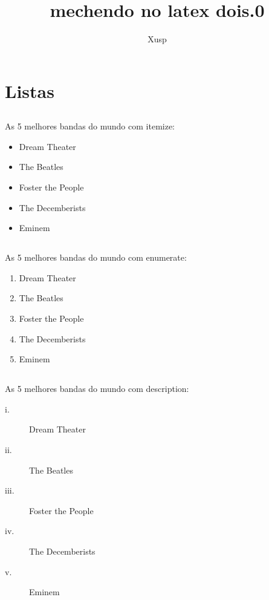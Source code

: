 \documentclass[a4paper,11pt]{report}
\title{mechendo no latex dois.0}
\author{Xusp}
\begin{document}
\maketitle
\tableofcontents
\chapter{Listas}
\section{}
\begin{samepage} %
As 5 melhores bandas do mundo com itemize:
\begin{itemize}
\item Dream Theater
\item The Beatles
\item Foster the People
\item The Decemberists
\item Eminem
\end{itemize}
\end{samepage}
\section{}
\begin{samepage}
As 5 melhores bandas do mundo com enumerate:
\begin{enumerate}
\item Dream Theater
\item The Beatles
\item Foster the People
\item The Decemberists
\item Eminem
\end{enumerate}
\end{samepage}
\section{}
\begin{samepage}
As 5 melhores bandas do mundo com description:
\begin{description}
\item[i.] Dream Theater
\item[ii.] The Beatles
\item[iii.] Foster the People
\item[iv.] The Decemberists
\item[v.] Eminem
\end{description}
\end{samepage}
\end{document}
